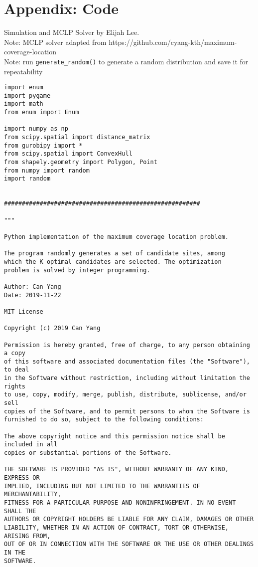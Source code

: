 \section{Appendix: Code}
	Simulation and MCLP Solver by Elijah Lee.\\
	\indent Note: MCLP solver adapted from https://github.com/cyang-kth/maximum-coverage-location\\
	\indent Note: run \verb|generate_random()| to generate a random distribution and save it for repeatability
	\begin{singlespace}
	\begin{verbatim}
import enum
import pygame
import math
from enum import Enum
 
import numpy as np
from scipy.spatial import distance_matrix
from gurobipy import *
from scipy.spatial import ConvexHull
from shapely.geometry import Polygon, Point
from numpy import random
import random
 
 
#######################################################
 
"""
 
Python implementation of the maximum coverage location problem.
 
The program randomly generates a set of candidate sites, among 
which the K optimal candidates are selected. The optimization 
problem is solved by integer programming. 
 
Author: Can Yang
Date: 2019-11-22
 
MIT License
 
Copyright (c) 2019 Can Yang
 
Permission is hereby granted, free of charge, to any person obtaining a copy
of this software and associated documentation files (the "Software"), to deal
in the Software without restriction, including without limitation the rights
to use, copy, modify, merge, publish, distribute, sublicense, and/or sell
copies of the Software, and to permit persons to whom the Software is
furnished to do so, subject to the following conditions:
 
The above copyright notice and this permission notice shall be included in all
copies or substantial portions of the Software.
 
THE SOFTWARE IS PROVIDED "AS IS", WITHOUT WARRANTY OF ANY KIND, EXPRESS OR
IMPLIED, INCLUDING BUT NOT LIMITED TO THE WARRANTIES OF MERCHANTABILITY,
FITNESS FOR A PARTICULAR PURPOSE AND NONINFRINGEMENT. IN NO EVENT SHALL THE
AUTHORS OR COPYRIGHT HOLDERS BE LIABLE FOR ANY CLAIM, DAMAGES OR OTHER
LIABILITY, WHETHER IN AN ACTION OF CONTRACT, TORT OR OTHERWISE, ARISING FROM,
OUT OF OR IN CONNECTION WITH THE SOFTWARE OR THE USE OR OTHER DEALINGS IN THE
SOFTWARE.
 

\end{verbatim}
\end{singlespace}
